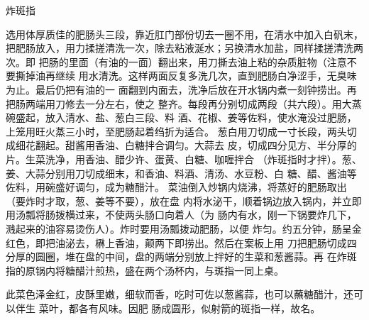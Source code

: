 \begin{recipe}{炸斑指}

\ingredients


\cooking

\step 选用体厚质佳的肥肠头三段，靠近肛门部份切去一圈不用，在清水中加入白矾末，
把肥肠放入，用力揉搓清洗一次，除去粘液涎水；另换清水加盐，同样揉搓清洗两次。即
把肠的里面（有油的一面）翻出来，用刀撕去油上粘的杂质脏物（注意不要撕掉油再继续
用水清洗。这样两面反复多洗几次，直到肥肠白净涩手，无臭味为止。最后仍把有油的一
面翻到内面去，洗净后放在开水锅内煮一刻钟捞出。再把肠两端用刀修去一分左右，使之
整齐。每段再分别切成两段（共六段）。用大蒸碗盛起，放入清水、盐、葱白三段、料
酒、花椒、姜等佐料，使水淹没过肥肠，上笼用旺火蒸三小时，至肥肠起着绉折为适合。
\step 葱白用刀切成一寸长段，两头切成细花翻起。甜酱用香油、白糖拌合调匀。大蒜去
皮，切成四分见方、半分厚的片。生菜洗净，用香油、醋少许、蛋黄、白糖、咖喱拌合
（炸斑指时才拌）。葱、姜、大蒜分别用刀切成细末，和香油、料酒、清汤、水豆粉、白
糖、醋、酱油等佐料，用碗盛好调匀，成为糖醋汁。
\step 菜油倒入炒锅内烧沸，将蒸好的肥肠取出（要炸时才取，葱、姜等不要），放在盘
内将水泌干，顺着锅边放入锅内，并立即用汤瓢将肠拨横过来，不使两头肠口向着人（为
肠内有水，刚一下锅要炸几下，溅起来的油容易烫伤人）。炸时要用汤瓢拨动肥肠，以便
炸匀。约五分钟，肠呈金红色，即把油泌去，楙上香油，颠两下即捞出。然后在案板上用
刀把肥肠切成四分厚的圆圈，堆在盘的中间，盘的两端分别放上拌好的生菜和葱酱蒜。再
在炸斑指的原锅内将糖醋汁煎热，盛在两个汤杯内，与斑指一同上桌。

\notes

此菜色泽金红，皮酥里嫩，细软而香，吃时可佐以葱酱蒜，也可以蘸糖醋汁，还可以伴生
菜叶，都各有风味。因肥 肠成圆形，似射箭的斑指一样，故名。

\end{recipe}

